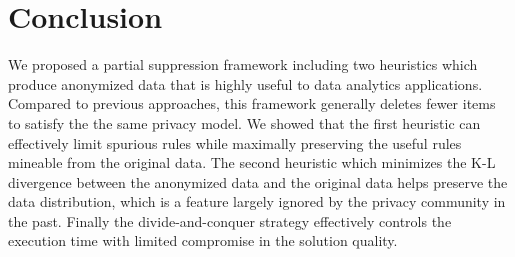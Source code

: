 \section{Conclusion}
\label{sec:conclude}
We proposed a partial suppression framework including
two heuristics which produce anonymized data 
that is highly useful to data analytics applications.
Compared to previous approaches,
this framework generally deletes fewer items to satisfy the the same
privacy model.
We showed that the first heuristic can
effectively limit spurious rules while maximally preserving
the useful rules mineable from the original data. 
The second heuristic which minimizes the K-L divergence between the
anonymized data and the original data helps preserve the
data distribution, which is a feature largely ignored by the privacy
community in the past.
Finally the divide-and-conquer strategy effectively controls 
the execution time with limited compromise in the solution quality.


%
%

